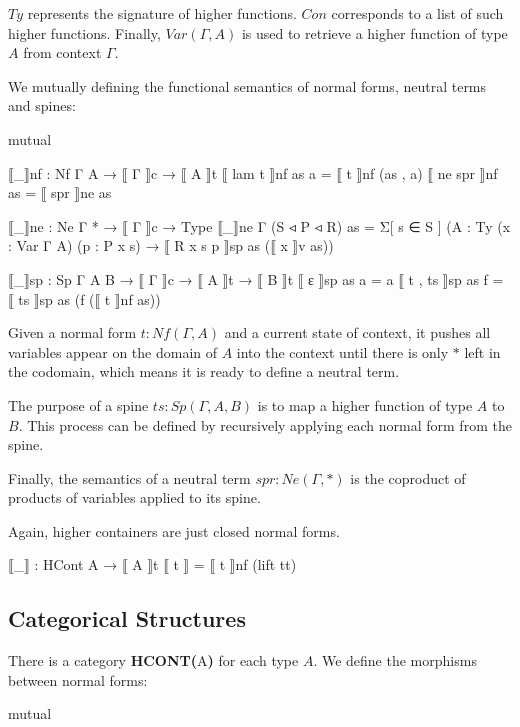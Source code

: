 $Ty$ represents the signature of higher functions. $Con$ corresponds to a list of such higher functions. Finally, $Var(\Gamma,A)$ is used to retrieve a higher function of type $A$ from context $\Gamma$.

We mutually defining the functional semantics of normal forms, neutral terms and spines:

\begin{code}[hide]
mutual
\end{code}

\begin{code}
  ⟦_⟧nf : Nf Γ A → ⟦ Γ ⟧c → ⟦ A ⟧t
  ⟦ lam t ⟧nf as a = ⟦ t ⟧nf (as , a)
  ⟦ ne spr ⟧nf as = ⟦ spr ⟧ne as

  ⟦_⟧ne : Ne Γ * → ⟦ Γ ⟧c → Type
  ⟦_⟧ne {Γ} (S ◃ P ◃ R) as =
    Σ[ s ∈ S ] ({A : Ty} (x : Var Γ A) (p : P x s)
      → ⟦ R x s p ⟧sp as (⟦ x ⟧v as))

  ⟦_⟧sp : Sp Γ A B → ⟦ Γ ⟧c → ⟦ A ⟧t → ⟦ B ⟧t
  ⟦ ε ⟧sp as a = a
  ⟦ t , ts ⟧sp as f = ⟦ ts ⟧sp as (f (⟦ t ⟧nf as))
\end{code}

Given a normal form $t : Nf(\Gamma,A)$ and a current state of context, it pushes all variables appear on the domain of $A$ into the context until there is only $*$ left in the codomain, which means it is ready to define a neutral term. 

The purpose of a spine $ts : Sp(\Gamma,A,B)$ is to map a higher function of type $A$ to $B$. This process can be defined by recursively applying each normal form from the spine.

Finally, the semantics of a neutral term $spr : Ne(\Gamma,*)$ is the coproduct of products of variables applied to its spine.

Again, higher containers are just closed normal forms.

\begin{code}
⟦_⟧ : HCont A → ⟦ A ⟧t
⟦ t ⟧ = ⟦ t ⟧nf (lift tt)
\end{code}

\subsection{Categorical Structures}

There is a category \textbf{HCONT(}A\textbf{)} for each type $A$. We define the morphisms between normal forms:

\begin{code}[hide]
mutual
\end{code}

